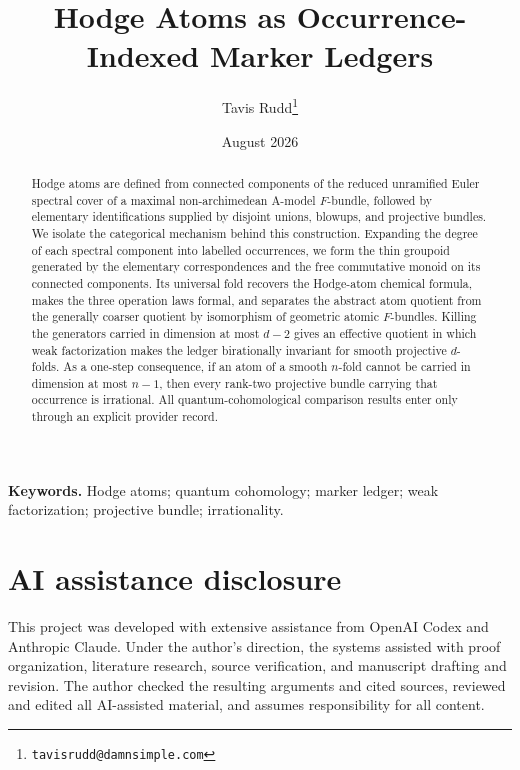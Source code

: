 \documentclass[11pt]{article}
\title{Hodge Atoms as Occurrence-Indexed Marker Ledgers}
\author{Tavis Rudd\thanks{\texttt{tavisrudd@damnsimple.com}}}
\date{August 2026}
\numberwithin{equation}{section}
\theoremstyle{definition}
\theoremstyle{remark}
\begin{document}
\maketitle

\begin{abstract}
Hodge atoms are defined from connected components of the reduced unramified
Euler spectral cover of a maximal non-archimedean A-model $F$-bundle,
followed by elementary identifications supplied by disjoint unions, blowups,
and projective bundles.  We isolate the categorical mechanism behind this
construction.  Expanding the degree of each spectral component into labelled
occurrences, we form the thin groupoid generated by the elementary
correspondences and the free commutative monoid on its connected components.
Its universal fold recovers the Hodge-atom chemical formula, makes the three
operation laws formal, and separates the abstract atom quotient from the
generally coarser quotient by isomorphism of geometric atomic $F$-bundles.
Killing the generators carried in dimension at most $d-2$ gives an effective
quotient in which weak factorization makes the ledger birationally invariant
for smooth projective $d$-folds.  As a one-step consequence, if an atom of a
smooth $n$-fold cannot be carried in dimension at most $n-1$, then every
rank-two projective bundle carrying that occurrence is irrational.  All
quantum-cohomological comparison results enter only through an explicit
provider record.
\end{abstract}

\noindent\textbf{Keywords.} Hodge atoms; quantum cohomology; marker ledger;
weak factorization; projective bundle; irrationality.






\section*{AI assistance disclosure}

This project was developed with extensive assistance from OpenAI Codex and
Anthropic Claude.  Under the author's direction, the systems assisted with
proof organization, literature research, source verification, and manuscript
drafting and revision.  The author checked the resulting arguments and cited
sources, reviewed and edited all AI-assisted material, and assumes
responsibility for all content.
\end{document}
